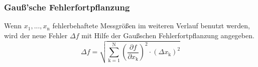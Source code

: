 \subsubsection{Gauß'sche Fehlerfortpflanzung}
Wenn $x_\text{1}, ..., x_\text{n}$ fehlerbehaftete Messgrößen im weiteren Verlauf benutzt werden, wird der neue Fehler $\Delta f$ mit Hilfe der Gaußschen Fehlerfortpflanzung angegeben.
\begin{equation}
	\Delta f = \sqrt{\sum_{\text{k}=1}^\text{N} \left( \frac{ \partial f}{\partial x_\text{k}} \right) ^2 \cdot (\Delta x_\text{k})^2}
	\label{eqn:var}
\end{equation}
